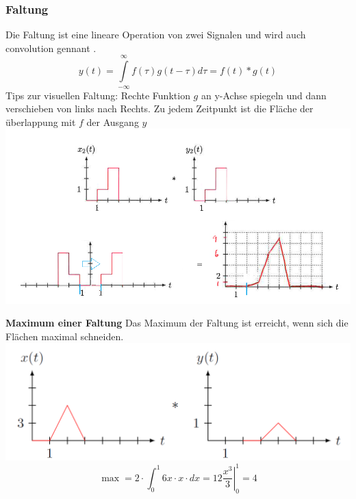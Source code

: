 \subsubsection{Faltung}
Die Faltung ist eine lineare Operation von zwei Signalen und wird auch convolution gennant .
\[
y(t) = \int\limits_{-\infty}^{\infty}f(\tau)g(t - \tau)d\tau = f(t) * g(t)
\]
Tips zur visuellen Faltung: Rechte Funktion $g$ an y-Achse spiegeln und dann verschieben von links nach Rechts. Zu jedem Zeitpunkt ist die Fläche der überlappung mit $f$ der Ausgang $y$
	\includegraphics[width=\linewidth,keepaspectratio=true]{Images/faltung}

\noindent\textbf{Maximum einer Faltung}
Das Maximum der Faltung ist erreicht, wenn sich die Flächen maximal schneiden.
\includegraphics[width=\columnwidth]{Images/faltung_maxi}
\[
\max = 2\cdot \int_{0}^{1}6x \cdot x \cdot dx = \left.12\frac{x^3}{3}\right|_0^1 = 4
\]


